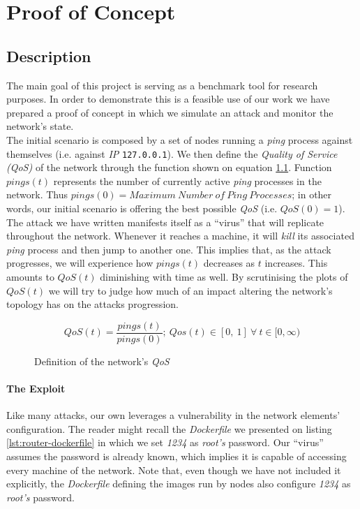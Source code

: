 \chapter{Proof of Concept}
    \section{Description}
        The main goal of this project is serving as a benchmark tool for research purposes. In order to demonstrate this is a feasible use of our work we have prepared a proof of concept in which we simulate an attack and monitor the network's state.\\

        The initial scenario is composed by a set of nodes running a \textit{ping} process against themselves (i.e. against \textit{IP} \texttt{127.0.0.1}). We then define the \textit{Quality of Service (QoS)} of the network through the function shown on equation \ref{eq:net-qos}. Function $pings(t)$ represents the number of currently active \textit{ping} processes in the network. Thus $pings(0) = Maximum\ Number\ of\ Ping\ Processes$; in other words, our initial scenario is offering the best possible \textit{QoS} (i.e. $QoS(0) = 1$).\\

        The attack we have written manifests itself as a ``virus'' that will replicate throughout the network. Whenever it reaches a machine, it will \textit{kill} its associated \textit{ping} process and then jump to another one. This implies that, as the attack progresses, we will experience how $pings(t)$ decreases as $t$ increases. This amounts to $QoS(t)$ diminishing with time as well. By scrutinising the plots of $QoS( t )$ we will try to judge how much of an impact altering the network's topology has on the attacks progression.\\

        {
            \renewcommand\figurename{Equation}
            \begin{figure}
                \[QoS(t) = \frac{pings(t)}{pings(0)};\ Qos(t) \in [0,\ 1]\ \forall\ t \in [0, \infty)\]
                \caption{Definition of the network's \textit{QoS}}
                \label{eq:net-qos}
            \end{figure}
        }

        \subsubsection{The Exploit}
            Like many attacks, our own leverages a vulnerability in the network elements' configuration. The reader might recall the \textit{Dockerfile} we presented on listing \ref{lst:router-dockerfile} in which we set \textit{1234} as \textit{root's} password. Our ``virus'' assumes the password is already known, which implies it is capable of accessing every machine of the network. Note that, even though we have not included it explicitly, the \textit{Dockerfile} defining the images run by nodes also configure \textit{1234} as \textit{root's} password.\\

